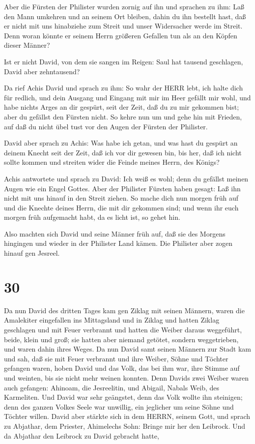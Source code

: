  Aber die Fürsten der Philister wurden zornig auf ihn und
sprachen zu ihm: Laß den Mann umkehren und an seinem Ort bleiben, dahin
du ihn bestellt hast, daß er nicht mit uns hinabziehe zum Streit und
unser Widersacher werde im Streit. Denn woran könnte er seinem Herrn
größeren Gefallen tun als an den Köpfen dieser Männer?

 Ist er nicht David, von dem sie sangen im Reigen: Saul hat
tausend geschlagen, David aber zehntausend?

 Da rief Achis David und sprach zu ihm: So wahr der HERR
lebt, ich halte dich für redlich, und dein Ausgang und Eingang mit mir
im Heer gefällt mir wohl, und habe nichts Arges an dir gespürt, seit der
Zeit, daß du zu mir gekommen bist; aber du gefällst den Fürsten nicht.
 So kehre nun um und gehe hin mit Frieden, auf daß du nicht
übel tust vor den Augen der Fürsten der Philister.

 David aber sprach zu Achis: Was habe ich getan, und was
hast du gespürt an deinem Knecht seit der Zeit, daß ich vor dir gewesen
bin, bis her, daß ich nicht sollte kommen und streiten wider die Feinde
meines Herrn, des Königs?

 Achis antwortete und sprach zu David: Ich weiß es wohl;
denn du gefällst meinen Augen wie ein Engel Gottes. Aber der Philister
Fürsten haben gesagt: Laß ihn nicht mit uns hinauf in den Streit ziehen.
 So mache dich nun morgen früh auf und die Knechte deines
Herrn, die mit dir gekommen sind; und wenn ihr euch morgen früh
aufgemacht habt, da es licht ist, so gehet hin.

 Also machten sich David und seine Männer früh auf, daß sie
des Morgens hingingen und wieder in der Philister Land kämen. Die
Philister aber zogen hinauf gen Jesreel.

\hypertarget{section-29}{%
\section{30}\label{section-29}}

 Da nun David des dritten Tages kam gen Ziklag mit seinen
Männern, waren die Amalekiter eingefallen ins Mittagsland und in Ziklag
und hatten Ziklag geschlagen und mit Feuer verbrannt  und
hatten die Weiber daraus weggeführt, beide, klein und groß; sie hatten
aber niemand getötet, sondern weggetrieben, und waren dahin ihres Weges.
 Da nun David samt seinen Männern zur Stadt kam und sah, daß
sie mit Feuer verbrannt und ihre Weiber, Söhne und Töchter gefangen
waren,  hoben David und das Volk, das bei ihm war, ihre
Stimme auf und weinten, bis sie nicht mehr weinen konnten. 
Denn Davids zwei Weiber waren auch gefangen: Ahinoam, die Jesreelitin,
und Abigail, Nabals Weib, des Karmeliten.  Und David war
sehr geängstet, denn das Volk wollte ihn steinigen; denn des ganzen
Volkes Seele war unwillig, ein jeglicher um seine Söhne und Töchter
willen. David aber stärkte sich in dem HERRN, seinem Gott, 
und sprach zu Abjathar, dem Priester, Ahimelechs Sohn: Bringe mir her
den Leibrock. Und da Abjathar den Leibrock zu David gebracht hatte,

